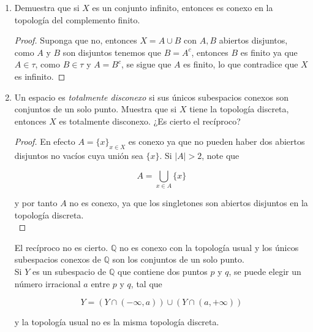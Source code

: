 \documentclass[11pt]{article}
\begin{document}
\begin{enumerate}
    \begin{proof}
        Note que $$A\cup \bigcup_{\alpha}A_{\alpha}=\bigcup_{\alpha}(A\cup A_{\alpha})$$

        y como $A\subset \displaystyle \bigcap_{\alpha}(A\cup A_{\alpha}) 
            $, y $A\neq \emptyset$, entonces por el punto anterior se concluye lo deseado.
    \end{proof}
    
    \item Demuestra que si $X$ es un conjunto infinito, entonces es conexo en la topología del complemento finito.

    \begin{proof}
        Suponga que no, entonces $X=A\cup B$ con $A,B$ abiertos disjuntos, como $A$ y $B$ son disjuntos tenemos que $B=A^{c}$, entonces $B$ es finito ya que $A\in \tau$, como $B\in \tau$ y $A=B^{c}$, se sigue que $A$ es finito, lo que contradice que $X$ es infinito.
    \end{proof}
    
    \item Un espacio es \textit{totalmente disconexo} si sus únicos subespacios conexos son conjuntos de un solo punto. Muestra que si $X$ tiene la topología discreta, entonces $X$ es totalmente disconexo. ¿Es cierto el recíproco?

    \begin{proof}
        En efecto $A=\{x\}_{x\in X}$ es conexo ya que no pueden haber dos abiertos disjuntos no vacíos cuya unión sea $\{x\}$. Si $|A|>2$, note que 

        $$A=\bigcup_{x\in A}\{x\}
            $$

        y por tanto $A$ no es conexo, ya que los singletones son abiertos disjuntos en la topología discreta.\\
    \end{proof}
    
    El recíproco no es cierto. $\mathbb{Q}$ no es conexo con la topología usual y los únicos subespacios conexos de $\mathbb{Q}$ son los conjuntos de un solo punto.\\

    Si $Y$ es un subespacio de $\mathbb{Q}$ que contiene dos puntos $p$ y $q$, se puede elegir un número irracional $a$ entre $p$ y $q$, tal que

$$
Y=(Y \cap (-\infty, a)) \cup  (Y \cap (a, +\infty))
$$

y la topología usual  no es la misma topología discreta.


\end{enumerate}
\end{document}

